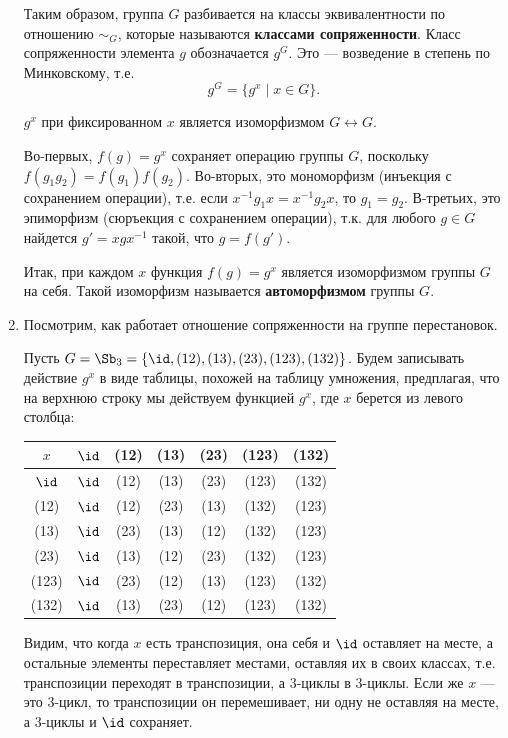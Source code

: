 \begin{enumerate}
Таким образом, группа $G$ разбивается на классы эквивалентности по отношению $\sim_G$, которые называются \textbf{классами сопряженности}. Класс сопряженности элемента $g$ обозначается $g^G$. Это --- возведение в степень по Минковскому, т.е.
$$
g^G=\{g^x\mid x\in G\}.
$$

\begin{lem} $g^x$ при фиксированном $x$ является изоморфизмом $G\leftrightarrow G$.
\end{lem}
\pf
Во-первых, $f(g)=g^x$ сохраняет операцию группы $G$, поскольку $f(g_1g_2)=f(g_1)f(g_2)$. Во-вторых, это мономорфизм (инъекция с сохранением операции), т.е. если $x^{-1}g_1x=x^{-1}g_2x$, то $g_1=g_2$. В-третьих, это эпиморфизм (сюръекция с сохранением операции), т.к. для любого $g\in G$ найдется $g'=xgx^{-1}$ такой, что $g=f(g')$.
\epf

Итак, при каждом $x$ функция $f(g)=g^x$ является изоморфизмом группы $G$ на себя. Такой изоморфизм называется \textbf{автоморфизмом} группы $G$.

\item Посмотрим, как работает отношение сопряженности на группе перестановок.

Пусть $G=\Sb_3 = \{\id,(12),(13),(23),(123),(132)\}$. Будем записывать действие $g^x$ в виде таблицы, похожей на таблицу умножения, предплагая, что на верхнюю строку мы действуем функцией $g^x$, где $x$ берется из левого столбца:
\begin{center}
\begin{tabular}{c|c|ccc|cc}
$x$&  $\id$	& (12)	& (13)	& (23)	& (123)	& (132) \\ \hline
$\id$&$\id$	& (12)	& (13)	& (23)	& (123)	& (132) \\
(12)& $\id$	& (12)	& (23)	& (13)	& (132)	& (123) \\
(13)& $\id$	& (23)	& (13)	& (12)	& (132)	& (123) \\
(23)& $\id$	& (13)	& (12)	& (23)	& (132)	& (123) \\
(123)&$\id$	& (23)	& (12)	& (13)	& (123)	& (132) \\
(132)&$\id$	& (13)	& (23)	& (12)	& (123)	& (132)
\end{tabular}
\end{center}
Видим, что когда $x$ есть транспозиция, она себя и $\id$ оставляет на месте, а остальные элементы переставляет местами, оставляя их в своих классах, т.е. транспозиции переходят в транспозиции, а 3-циклы в 3-циклы. Если же $x$ --- это 3-цикл, то транспозиции он перемешивает, ни одну не оставляя на месте, а 3-циклы и $\id$ сохраняет.


\end{enumerate}
